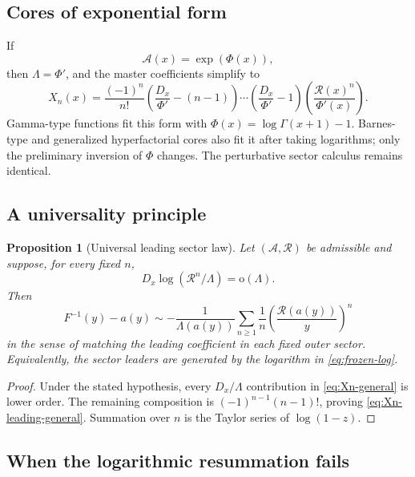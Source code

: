\documentclass[11pt,a4paper]{article}
\numberwithin{equation}{section}
\newtheorem{proposition}[theorem]{Proposition}
\theoremstyle{definition}
\theoremstyle{remark}
\newcommand{\littleo}{\mathrm o}
\newcommand{\Core}{\mathcal A}
\newcommand{\Lam}{\Lambda}
\newcommand{\Res}{\mathcal R}
\begin{document}
\subsection{Cores of exponential form}

If
\begin{equation}\label{eq:A-exp-Phi}
 \Core(x)=\exp(\Phi(x)),
\end{equation}
then $\Lam=\Phi'$, and the master coefficients simplify to
\begin{equation}\label{eq:Xn-Phi}
 X_n(x)=\frac{(-1)^n}{n!}
 \left(\frac{D_x}{\Phi'}-(n-1)\right)\cdots
 \left(\frac{D_x}{\Phi'}-1\right)
 \left(\frac{\Res(x)^n}{\Phi'(x)}\right).
\end{equation}
Gamma-type functions fit this form with
$\Phi(x)=\log\Gamma(x+1)-1$.  Barnes-type and generalized hyperfactorial
cores also fit it after taking logarithms; only the preliminary inversion of
$\Phi$ changes.  The perturbative sector calculus remains identical.

\subsection{A universality principle}

\begin{proposition}[Universal leading sector law]
\label{prop:universal-sector}
Let $(\Core,\Res)$ be admissible and suppose, for every fixed $n$,
\[
 D_x\log(\Res^n/\Lam)=\littleo(\Lam).
\]
Then
\begin{equation}\label{eq:universal-sector-law}
 F^{-1}(y)-a(y)
 \sim-\frac1{\Lam(a(y))}
 \sum_{n\ge1}\frac1n
 \left(\frac{\Res(a(y))}{y}\right)^n
\end{equation}
in the sense of matching the leading coefficient in each fixed outer
sector.  Equivalently, the sector leaders are generated by the logarithm in
\eqref{eq:frozen-log}.
\end{proposition}

\begin{proof}
Under the stated hypothesis, every $D_x/\Lam$ contribution in
\eqref{eq:Xn-general} is lower order.  The remaining composition is
$(-1)^{n-1}(n-1)!$, proving \eqref{eq:Xn-leading-general}.  Summation over
$n$ is the Taylor series of $\log(1-z)$.
\end{proof}

\subsection{When the logarithmic resummation fails}
\end{document}

